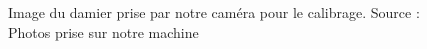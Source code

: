  	 \begin{figure}[h]
 	 	\centering
 	 	\caption[Image du damier]{Image du damier prise par notre caméra pour le calibrage. Source : Photos prise sur notre machine}
 	 	\label{fig:Image du damier}
 	 \end{figure}
 	 
